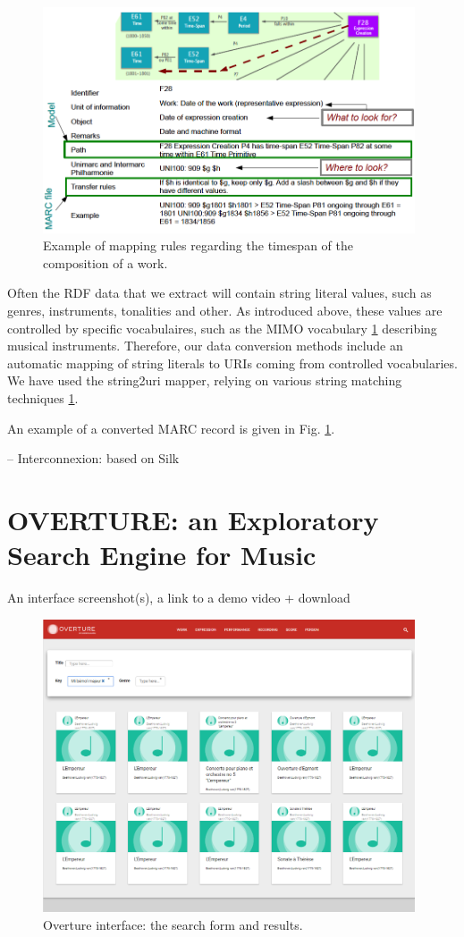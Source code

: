 \documentclass[runningheads,a4paper]{llncs}
\begin{document}
\begin{figure}
  \centering
  \includegraphics[width=11cm]{img/mapping-rules.png}
  \caption{Example of mapping rules regarding the timespan of the composition of a work.}
  \label{fig:mappings}
\end{figure}

Often the RDF data that we extract will contain string literal values, such as genres, instruments, tonalities and other. As introduced above, these values are controlled by specific vocabulaires, such as the MIMO vocabulary \ref{} describing musical instruments. Therefore, our data conversion methods include an automatic mapping of string literals to URIs coming from controlled vocabularies. We have used the string2uri mapper, relying on various string matching techniques \ref{}.

An example of a converted MARC record is given in Fig. \ref{}.  

-- Interconnexion: based on Silk


\section{OVERTURE: an Exploratory Search Engine for Music}

An interface screenshot(s), a link to a demo video + download

\begin{figure}
  \centering
  \includegraphics[width=11cm]{img/overture-list.png}
  \caption{Overture interface: the search form and results.}
  \label{fig:overture-list}
\end{figure}
\end{document}
